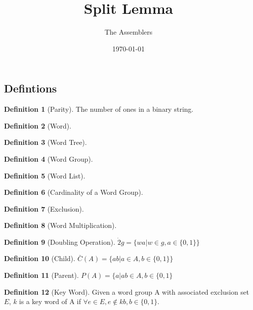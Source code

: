 \documentclass[11pt,leqno]{article}
\theoremstyle{definition}
\newtheorem{definition}{Definition}[section]
\theoremstyle{remark}
\begin{document}
\title{Split Lemma}
\author{The Assemblers}
\date{\today}
\maketitle

\subsection{Defintions}
\begin{definition}[Parity]
The number of ones in a binary string.
\end{definition}

\begin{definition}[Word]
\end{definition}

\begin{definition}[Word Tree]
\end{definition}

\begin{definition}[Word Group]
\end{definition}

\begin{definition}[Word List]
\end{definition}

\begin{definition}[Cardinality of a Word Group]
\end{definition}

\begin{definition}[Exclusion]
\end{definition}

\begin{definition}[Word Multiplication]
\end{definition}

\begin{definition}[Doubling Operation]
	$\dot{2}g = \{wa | w \in g, a \in \{0, 1\}\}$
\end{definition}

\begin{definition}[Child]
	$\bar{C}(A) = \{ab | a \in A, b \in \{0,1\}\}$
\end{definition}

\begin{definition}[Parent]
	$P(A) = \{a | ab \in A, b \in \{0,1\}$
\end{definition}

\begin{definition}[Key Word]
	Given a word group A with associated exclusion set $E$, $k$ is a key word of A if $\forall e \in E, e\notin kb, b \in \{0, 1\}$.
\end{definition} 
\end{document}

